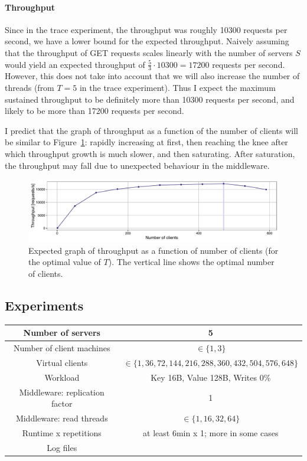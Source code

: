\documentclass[11pt]{article}
\newcommand{\todo}[1]{\fcolorbox{black}{Apricot}{TODO: #1}}
\begin{document}
\paragraph{Throughput}
Since in the trace experiment, the throughput was roughly 10300 requests per second, we have a lower bound for the expected throughput. Naively assuming that the throughput of GET requests scales linearly with the number of servers $S$ would yield an expected throughput of $\frac{5}{3} \cdot 10300 = 17200$ requests per second. However, this does not take into account that we will also increase the number of threads (from $T=5$ in the trace experiment). Thus I expect the maximum sustained throughput to be definitely more than 10300 requests per second, and likely to be more than 17200 requests per second.

I predict that the graph of throughput as a function of the number of clients will be similar to Figure~\ref{fig:exp1:hyp:throughput}: rapidly increasing at first, then reaching the knee after which throughput growth is much slower, and then saturating. After saturation, the throughput may fall due to unexpected behaviour in the middleware.

\begin{figure}[h]
\centering
\includegraphics[width=\textwidth]{figures/hypothesis_throughput.pdf}
\caption{Expected graph of throughput as a function of number of clients (for the optimal value of $T$). The vertical line shows the optimal number of clients.}
\label{fig:exp1:hyp:throughput}
\end{figure}

\subsection{Experiments}
\begin{center}
\small{
\smallskip
\begin{tabular}{|c|c|}
\hline Number of servers & 5 \\ 
\hline Number of client machines & $\in \{1, 3\}$ \\ 
\hline Virtual clients & $\in \{1, 36, 72, 144, 216, 288, 360, 432, 504, 576, 648\}$ \\ 
\hline Workload & Key 16B, Value 128B, Writes 0\% \\
\hline Middleware: replication factor & 1 \\ 
\hline Middleware: read threads & $\in\{1, 16, 32, 64\}$ \\ 
\hline Runtime x repetitions & at least 6min x 1; more in some cases \\ 
\hline Log files & \todo{} \\
\hline 
\end{tabular} }
\end{center}
\end{document}
